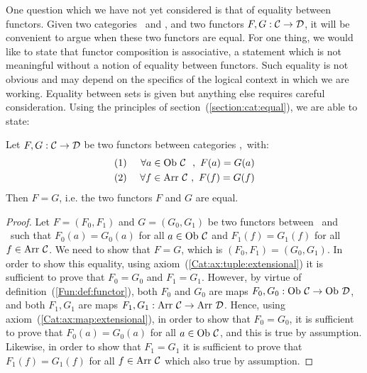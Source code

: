 One question which we have not yet considered is that of equality between
functors. Given two categories \Cat\ and \Dat, and two functors $F,G:\mbox{$\cal C$}\to\mbox{$\cal D$}$, 
it will be convenient to argue when these two functors are equal. For one thing,
we would like to state that functor composition is associative, a statement which
is not meaningful without a notion of equality between functors. Such equality
is not obvious and may depend on the specifics of the logical context in 
which we are working. Equality between sets is given but anything else requires
careful consideration. Using the principles of section~(\ref{section:cat:equal}), 
we are able to state: 

\begin{prop}\label{Fun:prop:equal}
    Let $F,G:\mbox{$\cal C$}\to\mbox{$\cal D$}$ be two functors between categories \Cat,\Dat\ with:
        \begin{eqnarray*}
            (1)&\ &\forall a\in\mbox{\rm Ob}\ \mbox{$\cal C$}\ \ ,\ F(a)=G(a)\\
            (2)&\ &\forall f\in\mbox{\rm Arr}\ \mbox{$\cal C$}\ ,\ F(f)=G(f)
        \end{eqnarray*}
Then $F=G$, i.e. the two functors $F$ and $G$ are equal.
\end{prop}
\begin{proof}
    Let $F=(F_{0},F_{1})$ and $G=(G_{0},G_{1})$ be two functors between \Cat\
    and \Dat\ such that $F_{0}(a)=G_{0}(a)$ for all $a\in\mbox{\rm Ob}\ \mbox{$\cal C$}$ and 
    $F_{1}(f)=G_{1}(f)$ for all $f\in\mbox{\rm Arr}\ \mbox{$\cal C$}$. We need to show that 
    $F=G$, which is $(F_{0},F_{1})=(G_{0},G_{1})$. In order to show this
    equality, using axiom~(\ref{Cat:ax:tuple:extensional}) it is sufficient
    to prove that $F_{0}=G_{0}$ and $F_{1}=G_{1}$. However, by virtue of
    definition~(\ref{Fun:def:functor}), both $F_{0}$ and $G_{0}$ are
    maps $F_{0},G_{0}:\ob\ \Cat\to\ob\ \Dat$, and both $F_{1},G_{1}$
    are maps $F_{1},G_{1}:\arr\ \Cat\to\arr\ \Dat$. Hence, using
    axiom~(\ref{Cat:ax:map:extensional}), in order to show that $F_{0}=G_{0}$,
    it is sufficient to prove that $F_{0}(a)=G_{0}(a)$ for all $a\in\mbox{\rm Ob}\ \mbox{$\cal C$}$,
    and this is true by assumption. Likewise, in order to show that
    $F_{1}=G_{1}$ it is sufficient to prove that $F_{1}(f)=G_{1}(f)$
    for all $f\in\mbox{\rm Arr}\ \mbox{$\cal C$}$ which also true by assumption.
\end{proof}
